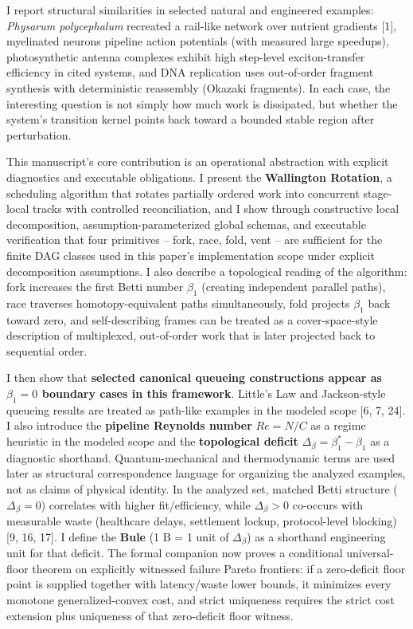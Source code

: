 \documentclass[
  11pt,
]{article}
\begin{document}
I report structural similarities in selected natural and engineered
examples: \emph{Physarum polycephalum} recreated a rail-like network
over nutrient gradients {[}1{]}, myelinated neurons pipeline action
potentials (with measured large speedups), photosynthetic antenna
complexes exhibit high step-level exciton-transfer efficiency in cited
systems, and DNA replication uses out-of-order fragment synthesis with
deterministic reassembly (Okazaki fragments). In each case, the
interesting question is not simply how much work is dissipated, but
whether the system's transition kernel points back toward a bounded
stable region after perturbation.

This manuscript's core contribution is an operational abstraction with
explicit diagnostics and executable obligations. I present the
\textbf{Wallington Rotation}, a scheduling algorithm that rotates
partially ordered work into concurrent stage-local tracks with
controlled reconciliation, and I show through constructive local
decomposition, assumption-parameterized global schemas, and executable
verification that four primitives -- fork, race, fold, vent -- are
sufficient for the finite DAG classes used in this paper's
implementation scope under explicit decomposition assumptions. I also
describe a topological reading of the algorithm: fork increases the
first Betti number \(\beta_1\) (creating independent parallel paths),
race traverses homotopy-equivalent paths simultaneously, fold projects
\(\beta_1\) back toward zero, and self-describing frames can be treated
as a cover-space-style description of multiplexed, out-of-order work
that is later projected back to sequential order.

I then show that \textbf{selected canonical queueing constructions
appear as \(\beta_1 = 0\) boundary cases in this framework}. Little's
Law and Jackson-style queueing results are treated as path-like examples
in the modeled scope {[}6, 7, 24{]}. I also introduce the
\textbf{pipeline Reynolds number} \(Re = N/C\) as a regime heuristic in
the modeled scope and the \textbf{topological deficit}
\(\Delta_\beta = \beta_1^* - \beta_1\) as a diagnostic shorthand.
Quantum-mechanical and thermodynamic terms are used later as structural
correspondence language for organizing the analyzed examples, not as
claims of physical identity. In the analyzed set, matched Betti
structure (\(\Delta_\beta = 0\)) correlates with higher fit/efficiency,
while \(\Delta_\beta > 0\) co-occurs with measurable waste (healthcare
delays, settlement lockup, protocol-level blocking) {[}9, 16, 17{]}. I
define the \textbf{Bule} (1 B = 1 unit of \(\Delta_\beta\)) as a
shorthand engineering unit for that deficit. The formal companion now
proves a conditional universal-floor theorem on explicitly witnessed
failure Pareto frontiers: if a zero-deficit floor point is supplied
together with latency/waste lower bounds, it minimizes every monotone
generalized-convex cost, and strict uniqueness requires the strict cost
extension plus uniqueness of that zero-deficit floor witness.
\end{document}
